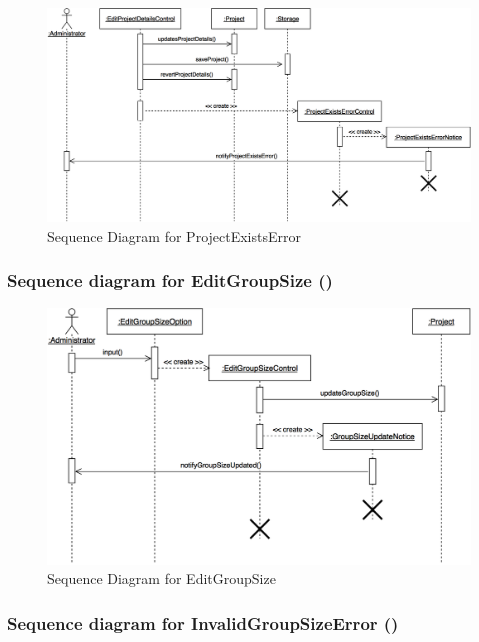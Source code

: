 \documentclass[12pt,letterpaper]{article}
\begin{document}
\begin{figure}[H]
	\centering{}
	\includegraphics[scale=0.3]{imgs/seq/project-exists-error.png}
	\caption{Sequence Diagram for ProjectExistsError}
\end{figure}

\subsubsection*{Sequence diagram for EditGroupSize (\editgroupsize{})}

\begin{figure}[H]
	\centering{}
	\includegraphics[scale=0.3]{imgs/seq/edit-group-size.png}
	\caption{Sequence Diagram for EditGroupSize}
\end{figure}

\subsubsection*{Sequence diagram for InvalidGroupSizeError (\invalidgroupsizeerror{})}
\end{document}

